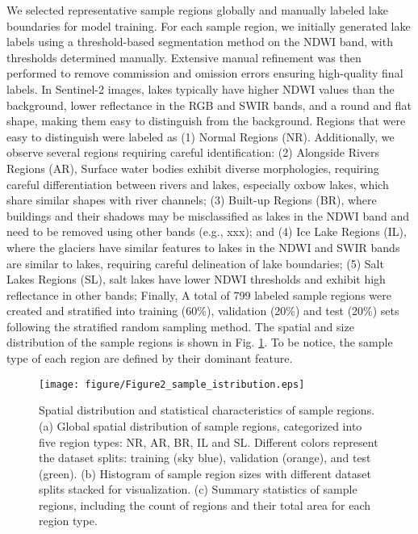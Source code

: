 \documentclass[preprint,12pt,authoryear]{elsarticle}
\begin{document}
We selected representative sample regions globally and manually labeled lake boundaries for model training. For each sample region, we initially generated lake labels using a threshold-based segmentation method on the NDWI band, with thresholds determined manually. Extensive manual refinement was then performed to remove commission and omission errors ensuring high-quality final labels. In Sentinel-2 images, lakes typically have higher NDWI values than the background, lower reflectance in the RGB and SWIR bands, and a round and flat shape, making them easy to distinguish from the background. Regions that were easy to distinguish were labeled as (1) Normal Regions (NR). Additionally, we observe several regions requiring careful identification: (2) Alongside Rivers Regions (AR), Surface water bodies exhibit diverse morphologies, requiring careful differentiation between rivers and lakes, especially oxbow lakes, which share similar shapes with river channels; (3) Built-up Regions (BR), where buildings and their shadows may be misclassified as lakes in the NDWI band and need to be removed using other bands (e.g., xxx); and (4) Ice Lake Regions (IL), where the glaciers have similar features to lakes in the NDWI and SWIR bands are similar to lakes, requiring careful delineation of lake boundaries; (5) Salt Lakes Regions (SL), salt lakes have lower NDWI thresholds and exhibit high reflectance in other bands; Finally, A total of 799 labeled sample regions were created and stratified into training (60\%), validation (20\%) and test (20\%) sets following the stratified random sampling method. The spatial and size distribution of the sample regions is shown in Fig. \ref{fig:Fig2}. To be notice, the sample type of each region are defined by their dominant feature.

\begin{figure}[h]
    \centering
    \texttt{[image: figure/Figure2\_sample\_istribution.eps]}
    \caption{Spatial distribution and statistical characteristics of sample regions. (a) Global spatial distribution of sample regions, categorized into five region types: NR, AR, BR, IL and SL. Different colors represent the dataset splits: training (sky blue), validation (orange), and test (green). (b) Histogram of sample region sizes with different dataset splits stacked for visualization. (c) Summary statistics of sample regions, including the count of regions and their total area for each region type.}
    \label{fig:Fig2}
\end{figure}
\end{document}
